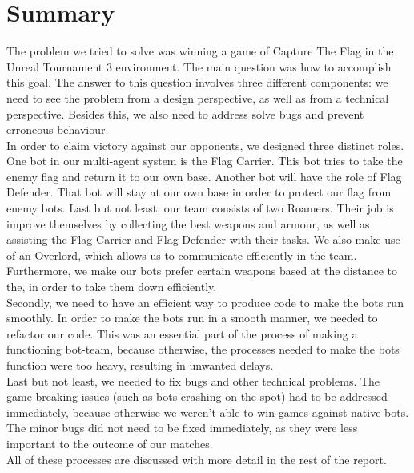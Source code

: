 \chapter*{Summary}
The problem we tried to solve was winning a game of Capture The Flag in the Unreal Tournament 3 environment. The main question was how to accomplish this goal. The answer to this question involves three different components: we need to see the problem from a design perspective, as well as from a technical perspective. Besides this, we also need to address solve bugs and prevent erroneous behaviour. \\

In order to claim victory against our opponents, we designed three distinct roles. One bot in our multi-agent system is the Flag Carrier. This bot tries to take the enemy flag and return it to our own base. Another bot will have the role of Flag Defender. That bot will stay at our own base in order to protect our flag from enemy bots. Last but not least, our team consists of two Roamers. Their job is improve themselves by collecting the best weapons and armour, as well as assisting the Flag Carrier and Flag Defender with their tasks. We also make use of an Overlord, which allows us to communicate efficiently in the team. Furthermore, we make our bots prefer certain weapons based at the distance to the, in order to take them down efficiently. \\

Secondly, we need to have an efficient way to produce code to make the bots run smoothly. In order to make the bots run in a smooth manner, we needed to refactor our code. This was an essential part of the process of making a functioning bot-team, because otherwise, the processes needed to make the bots function were too heavy, resulting in unwanted delays. \\

Last but not least, we needed to fix bugs and other technical problems. The game-breaking issues (such as bots crashing on the spot) had to be addressed immediately, because otherwise we weren't able to win games against native bots. The minor bugs did not need to be fixed immediately, as they were less important to the outcome of our matches. \\

All of these processes are discussed with more detail in the rest of the report.